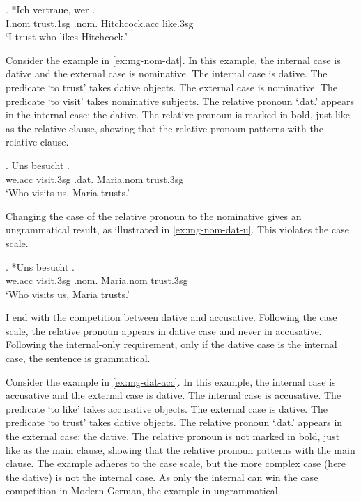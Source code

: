 \exg. *Ich vertraue, wer  .\\
I.\ac{nom} trust.1\ac{sg}\scsub{[dat]} .\ac{nom}. Hitchcock.\ac{acc} like.3\ac{sg}\scsub{[nom]}\\
`I trust who likes Hitchcock.' \label{ex:mg-dat-nom-u}

Consider the example in \ref{ex:mg-nom-dat}. In this example, the internal case is dative and the external case is nominative.
The internal case is dative. The predicate  `to trust' takes dative objects.
The external case is nominative. The predicate  `to visit' takes nominative subjects.
The relative pronoun  `.\ac{dat}.' appears in the internal case: the dative. The relative pronoun is marked in bold, just like as the relative clause, showing that the relative pronoun patterns with the relative clause.

\exg. Uns besucht   .\\
we.\ac{acc} visit.3\ac{sg}\scsub{[nom]} .\ac{dat}. Maria.\ac{nom} trust.3\ac{sg}\scsub{[dat]}\\
`Who visits us, Maria trusts.' \label{ex:mg-nom-dat}

Changing the case of the relative pronoun to the nominative gives an ungrammatical result, as illustrated in \ref{ex:mg-nom-dat-u}. This violates the case scale.

\exg. *Uns besucht   .\\
we.\ac{acc} visit.3\ac{sg}\scsub{[nom]} .\ac{nom}. Maria.\ac{nom} trust.3\ac{sg}\scsub{[dat]}\\
`Who visits us, Maria trusts.' \label{ex:mg-nom-dat-u}

I end with the competition between dative and accusative. Following the case scale, the relative pronoun appears in dative case and never in accusative. Following the internal-only requirement, only if the dative case is the internal case, the sentence is grammatical.

Consider the example in \ref{ex:mg-dat-acc}. In this example, the internal case is accusative and the external case is dative.
The internal case is accusative. The predicate  `to like' takes accusative objects.
The external case is dative. The predicate  `to trust' takes dative objects.
The relative pronoun  `.\ac{dat}.' appears in the external case: the dative. The relative pronoun is not marked in bold, just like as the main clause, showing that the relative pronoun patterns with the main clause.
The example adheres to the case scale, but the more complex case (here the dative) is not the internal case. As only the internal can win the case competition in Modern German, the example in ungrammatical.

